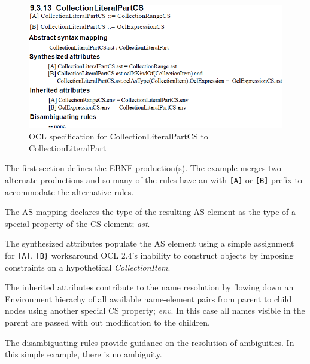 \documentclass{llncs}
\begin{document}
\begin{figure}[htbp]
\centering
\includegraphics[scale=0.45]{images/CollectionLiteralPartOMG.png}
\caption{OCL specification for CollectionLiteralPartCS to CollectionLiteralPart}
\label{fig:CollectionLiteralPartOMG}
\end{figure}
The first section defines the EBNF production(s). The example merges two alternate productions and so many of the rules have an with \verb$[A]$ or \verb$[B]$ prefix to accommodate the alternative rules.

The AS mapping declares the type of the resulting AS element as the type of a special property of the CS element; \emph{ast}.

The synthesized attributes populate the AS element using a simple assignment for \verb$[A]$. \verb$[B}$ worksaround OCL 2.4's inability to construct objects by imposing constraints on a hypothetical \emph{CollectionItem}.

The inherited attributes contribute to the name resolution by flowing down an Environment hierachy of all available name-element pairs from parent to child nodes using another special CS property; \emph{env}. In this case all names visible in the parent are passed with out modification to the children.

The disambiguating rules provide guidance on the resolution of ambiguities. In this simple example, there is no ambiguity.
\end{document}
